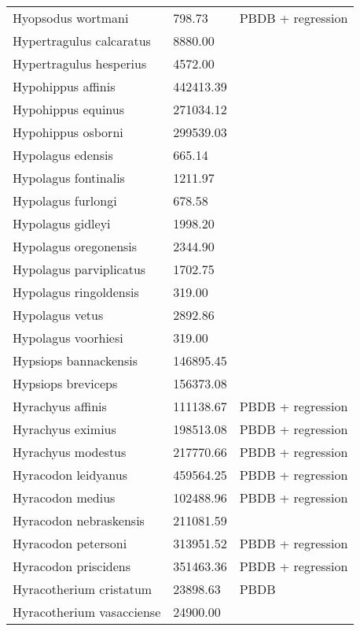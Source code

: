 \documentclass{article}
\begin{document}
\begin{center}
\begin{longtable}{p{} p{} p{} }
  Hyopsodus wortmani & 798.73 & PBDB + regression \\ 
  Hypertragulus calcaratus & 8880.00 & \cite{McKenna2011} \\ 
  Hypertragulus hesperius & 4572.00 & \cite{McKenna2011} \\ 
  Hypohippus affinis & 442413.39 & \cite{Tomiya2013} \\ 
  Hypohippus equinus & 271034.12 & \cite{Tomiya2013} \\ 
  Hypohippus osborni & 299539.03 & \cite{Tomiya2013} \\ 
  Hypolagus edensis & 665.14 & \cite{Tomiya2013} \\ 
  Hypolagus fontinalis & 1211.97 & \cite{Tomiya2013} \\ 
  Hypolagus furlongi & 678.58 & \cite{Tomiya2013} \\ 
  Hypolagus gidleyi & 1998.20 & \cite{Tomiya2013} \\ 
  Hypolagus oregonensis & 2344.90 & \cite{Tomiya2013} \\ 
  Hypolagus parviplicatus & 1702.75 & \cite{Tomiya2013} \\ 
  Hypolagus ringoldensis & 319.00 & \cite{McKenna2011} \\ 
  Hypolagus vetus & 2892.86 & \cite{Tomiya2013} \\ 
  Hypolagus voorhiesi & 319.00 & \cite{McKenna2011} \\ 
  Hypsiops bannackensis & 146895.45 & \cite{Wang1999} \\ 
  Hypsiops breviceps & 156373.08 & \cite{Tomiya2013} \\ 
  Hyrachyus affinis & 111138.67 & PBDB + regression \\ 
  Hyrachyus eximius & 198513.08 & PBDB + regression \\ 
  Hyrachyus modestus & 217770.66 & PBDB + regression \\ 
  Hyracodon leidyanus & 459564.25 & PBDB + regression \\ 
  Hyracodon medius & 102488.96 & PBDB + regression \\ 
  Hyracodon nebraskensis & 211081.59 & \cite{Tomiya2013} \\ 
  Hyracodon petersoni & 313951.52 & PBDB + regression \\ 
  Hyracodon priscidens & 351463.36 & PBDB + regression \\ 
  Hyracotherium cristatum & 23898.63 & PBDB \\ 
  Hyracotherium vasacciense & 24900.00 & \cite{MacFadden1986} \\ 

\end{longtable}
\end{center}
\end{document}
